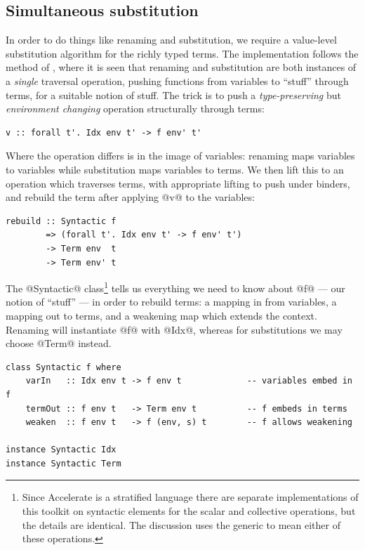 \subsection{Simultaneous substitution}
\label{sec:substitution}

In order to do things like renaming and substitution, we require a value-level
substitution algorithm for the richly typed terms. The implementation follows
the method of \citet{McBride:2006up,McBride:2005jv}, where it is seen that
renaming and substitution are both instances of a \emph{single} traversal
operation, pushing functions from variables to ``stuff'' through terms, for a
suitable notion of stuff.
%
The trick is to push a \emph{type-preserving} but \emph{environment changing}
operation structurally through terms:
%
\begin{lstlisting}[style=haskell]
v :: forall t'. Idx env t' -> f env' t'
\end{lstlisting}

Where the operation differs is in the image of variables: renaming maps
variables to variables while substitution maps variables to terms. We then lift
this to an operation which traverses terms, with appropriate lifting to push
under binders, and rebuild the term after applying @v@ to the variables:
%
\begin{lstlisting}[style=haskell]
rebuild :: Syntactic f
        => (forall t'. Idx env t' -> f env' t')
        -> Term env  t
        -> Term env' t
\end{lstlisting}

The @Syntactic@ class\footnote{Since Accelerate is a stratified
language\lang[stratified]{} there are separate implementations of this toolkit
on syntactic elements for the scalar and collective operations, but the details
are identical. The discussion uses the generic  to mean either of
these operations.} tells us everything we need to know about @f@ --- our notion
of ``stuff'' --- in order to rebuild terms: a mapping in from variables, a
mapping out to terms, and a weakening map which extends the context. Renaming
will instantiate @f@ with @Idx@, whereas for substitutions we may choose @Term@
instead.
%
\begin{lstlisting}[style=haskell]
class Syntactic f where
    varIn   :: Idx env t -> f env t             -- variables embed in f
    termOut :: f env t   -> Term env t          -- f embeds in terms
    weaken  :: f env t   -> f (env, s) t        -- f allows weakening

instance Syntactic Idx
instance Syntactic Term
\end{lstlisting}

